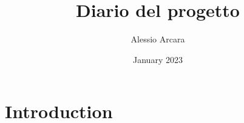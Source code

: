 \documentclass{article}
\title{Diario del progetto}
\author{Alessio Arcara}
\date{January 2023}
\begin{document}
    \maketitle


    \section{Introduction}
\end{document}
